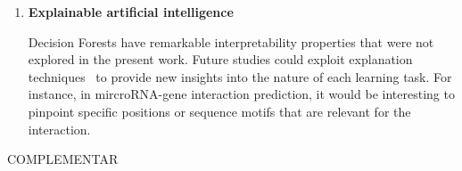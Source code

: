 \begin{enumerate}
    \item \textbf{Explainable artificial intelligence}

    Decision Forests have remarkable interpretability properties that were not explored in the present work. Future studies could exploit explanation techniques~\cite{breiman2001random,lundberg2019explainable,agarwal2023mdi} to provide new insights into the nature of each learning task.
    For instance, in mircroRNA-gene interaction prediction, it would be interesting to pinpoint specific positions or sequence motifs that are relevant for the interaction.

\end{enumerate}


COMPLEMENTAR  %
